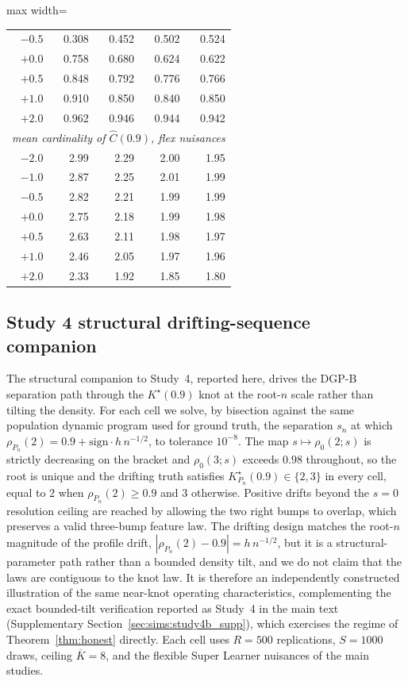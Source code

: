 \documentclass[11pt]{article}
\begin{document}
\begin{table}[ht!]
\begin{adjustbox}{max width=\textwidth}
\begin{tabular}{rrrrr}
$-0.5$ & 0.308 & 0.452 & 0.502 & 0.524\\
$+0.0$ & 0.758 & 0.680 & 0.624 & 0.622\\
$+0.5$ & 0.848 & 0.792 & 0.776 & 0.766\\
$+1.0$ & 0.910 & 0.850 & 0.840 & 0.850\\
$+2.0$ & 0.962 & 0.946 & 0.944 & 0.942\\
\midrule
\multicolumn{5}{l}{\textit{mean cardinality of $\widehat C(0.9)$, flex nuisances}}\\
$-2.0$ & 2.99 & 2.29 & 2.00 & 1.95\\
$-1.0$ & 2.87 & 2.25 & 2.01 & 1.99\\
$-0.5$ & 2.82 & 2.21 & 1.99 & 1.99\\
$+0.0$ & 2.75 & 2.18 & 1.99 & 1.98\\
$+0.5$ & 2.63 & 2.11 & 1.98 & 1.97\\
$+1.0$ & 2.46 & 2.05 & 1.97 & 1.96\\
$+2.0$ & 2.33 & 1.92 & 1.85 & 1.80\\
\bottomrule
\end{tabular}
\end{adjustbox}
\end{table}

\subsection{Study 4 structural drifting-sequence companion}\label{sec:sims:honest_supp}

The structural companion to Study~4, reported here, drives the DGP-B separation path through the $K^\star(0.9)$ knot at the root-$n$ scale rather than tilting the density. For each cell we solve, by bisection against the same population dynamic program used for ground truth, the separation $s_n$ at which $\rho_{P_n}(2)=0.9+\mathrm{sign}\cdot h\,n^{-1/2}$, to tolerance $10^{-8}$. The map $s\mapsto\rho_0(2;s)$ is strictly decreasing on the bracket and $\rho_0(3;s)$ exceeds $0.98$ throughout, so the root is unique and the drifting truth satisfies $K^\star_{P_n}(0.9)\in\{2,3\}$ in every cell, equal to $2$ when $\rho_{P_n}(2)\ge0.9$ and $3$ otherwise. Positive drifts beyond the $s=0$ resolution ceiling are reached by allowing the two right bumps to overlap, which preserves a valid three-bump feature law. The drifting design matches the root-$n$ magnitude of the profile drift, $|\rho_{P_n}(2)-0.9|=h\,n^{-1/2}$, but it is a structural-parameter path rather than a bounded density tilt, and we do not claim that the laws are contiguous to the knot law. It is therefore an independently constructed illustration of the same near-knot operating characteristics, complementing the exact bounded-tilt verification reported as Study~4 in the main text (Supplementary Section~\ref{sec:sims:study4b_supp}), which exercises the regime of Theorem~\ref{thm:honest} directly. Each cell uses $R=500$ replications, $S=1000$ draws, ceiling $\overline K=8$, and the flexible Super Learner nuisances of the main studies.
\end{document}
